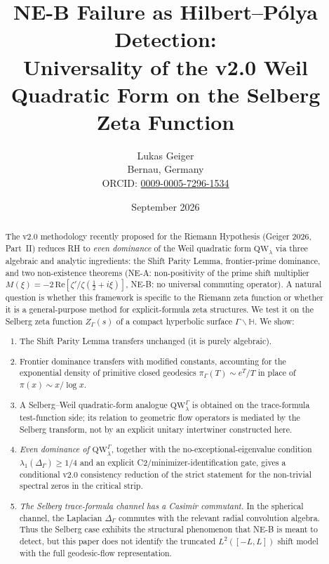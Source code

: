 \documentclass[12pt,a4paper]{article}
\title{NE-B Failure as Hilbert--Pólya Detection:\\
Universality of the v2.0 Weil Quadratic Form on the Selberg Zeta Function}
\author{Lukas Geiger\\
\small Bernau, Germany\\
\small ORCID: \href{https://orcid.org/0009-0005-7296-1534}{0009-0005-7296-1534}}
\date{September 2026}
\theoremstyle{definition}
\theoremstyle{remark}
\newcommand{\HH}{\mathbb{H}}
\newcommand{\QW}{\mathrm{QW}}
\newcommand{\Sel}{Z_{\Gamma}}
\newcommand{\Delop}{\Delta_{\Gamma}}
\begin{document}
\overfullrule=0pt
\setlength{\emergencystretch}{2.5em}
\maketitle
\vspace{-1.4em}

\begin{abstract}
The v2.0 methodology recently proposed for the Riemann Hypothesis (Geiger 2026,
Part~II) reduces RH to \emph{even dominance} of the Weil quadratic form
$\QW_\lambda$ via three algebraic and analytic ingredients: the Shift Parity
Lemma, frontier-prime dominance, and two non-existence theorems (NE-A:
non-positivity of the prime shift multiplier $M(\xi) = -2\,\mathrm{Re}[\zeta'/\zeta(\tfrac{1}{2}+i\xi)]$,
NE-B: no universal commuting operator). A natural question is whether this
framework is specific to the Riemann zeta function or whether it is a
general-purpose method for explicit-formula zeta structures. We test it on the
Selberg zeta function $\Sel(s)$ of a compact hyperbolic surface
$\Gamma\backslash\HH$. We show:

\begin{enumerate}[label=(\roman*),leftmargin=*,itemsep=0.15em,topsep=0.25em,parsep=0pt,partopsep=0pt]
\item The Shift Parity Lemma transfers unchanged (it is purely algebraic).
\item Frontier dominance transfers with modified constants, accounting for the
exponential density of primitive closed geodesics $\pi_\Gamma(T) \sim e^T/T$
in place of $\pi(x) \sim x/\log x$.
\item A Selberg--Weil quadratic-form analogue $\QW^\Gamma_\lambda$ is
obtained on the trace-formula test-function side; its relation to geometric
flow operators is mediated by the Selberg transform, not by an explicit
unitary intertwiner constructed here.
\item \emph{Even dominance of $\QW^\Gamma_\lambda$}, together with the
no-exceptional-eigenvalue condition $\lambda_1(\Delop)\ge 1/4$ and an
explicit C2/minimizer-identification gate, gives a conditional v2.0
consistency reduction of the strict statement for the non-trivial spectral
zeros in the critical strip.
\item \emph{The Selberg trace-formula channel has a Casimir commutant.} In
the spherical channel, the Laplacian $\Delop$ commutes with the relevant
radial convolution algebra. Thus the Selberg case exhibits the structural
phenomenon that NE-B is meant to detect, but this paper does not identify the
truncated $L^2([-L,L])$ shift model with the full geodesic-flow representation.
\end{enumerate}


\end{abstract}
\end{document}
